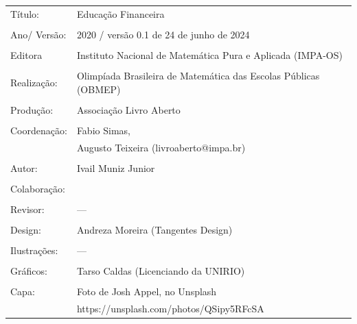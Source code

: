 
\begin{tabular}{p{}p{}}
Título: & Educação Financeira\\
\\
Ano/ Versão: & 2020 / versão 0.1 de 24 de junho de 2024\\
\\
Editora & Instituto Nacional de Matem\'atica Pura e Aplicada (IMPA-OS)\\
\\
Realização:& Olimp\'iada Brasileira de Matem\'atica das Escolas P\'ublicas (OBMEP)\\
\\
Produção:& Associação Livro Aberto\\
\\
Coordenação: & Fabio Simas, \\
			&  Augusto Teixeira (livroaberto@impa.br)\\
\\
  Autor: & Ivail Muniz Junior\\
        
\\
Colaboração: & \\
\\
Revisor: &  ---  \\
\\
Design: & Andreza Moreira (Tangentes Design) \\
\\
  Ilustrações: & --- \\ 
\\
Gráficos: & Tarso Caldas (Licenciando da UNIRIO)\\
\\
  Capa: & Foto de Josh Appel, no Unsplash \\
  		& https://unsplash.com/photos/QSipy5RFcSA \\

\end{tabular}
\vspace{.5cm}



